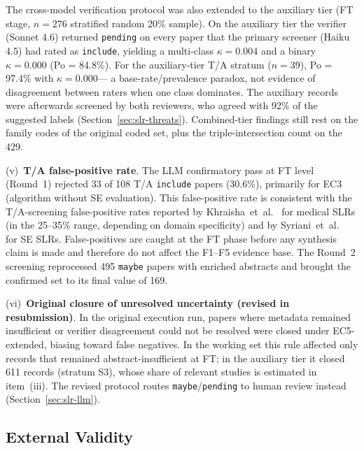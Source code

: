 

The cross-model verification protocol was also extended to the auxiliary
tier (FT stage, $n = 276$ stratified
random 20\% sample). On the auxiliary tier the verifier (Sonnet 4.6)
returned \texttt{pending} on every paper that the primary screener
(Haiku 4.5) had rated as \texttt{include}, yielding a multi-class
$\kappa = 0.004$ and a binary $\kappa = 0.000$ (Po = 84.8\%). For the
auxiliary-tier T/A stratum ($n=39$), Po = 97.4\% with $\kappa = 0.000$---
a base-rate/prevalence paradox, not evidence of disagreement between raters
when one class dominates. The auxiliary records were afterwards screened by
both reviewers, who agreed with 92\% of the suggested labels
(Section~\ref{sec:slr-threats}). Combined-tier findings still rest on the
family codes of the original coded set, plus the triple-intersection count
on the 429.



(v)~\textbf{T/A false-positive rate}.
The LLM confirmatory pass at FT level (Round~1) rejected 33 of 108 T/A
\texttt{include} papers (30.6\%), primarily for EC3 (algorithm without SE
evaluation). This false-positive rate is consistent with the
T/A-screening false-positive rates reported by Khraisha~et~al.\
\cite{khraisha2024} for medical SLRs (in the 25--35\% range, depending on
domain specificity) and by Syriani~et~al.~\cite{syriani2023} for SE
SLRs. False-positives are caught at the FT phase before any synthesis claim
is made and therefore do not affect the F1--F5 evidence base. The Round~2
screening reprocessed 495 \texttt{maybe} papers with enriched abstracts and
brought the confirmed set to its final value of 169.

(vi)~\textbf{Original closure of unresolved uncertainty (revised in resubmission)}.
In the original execution run, papers where metadata remained insufficient or
verifier disagreement could not be resolved were closed under EC5-extended,
biasing toward false negatives. In the working set this rule affected only
records that remained abstract-insufficient at FT; in the auxiliary tier it
closed 611 records (stratum S3), whose share of relevant studies is
estimated in item~(iii). The revised protocol routes
\texttt{maybe}/\texttt{pending} to human review instead
(Section~\ref{sec:slr-llm}).

\subsection{External Validity}

